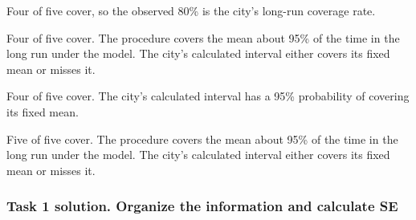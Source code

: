 
\begin{answeroptions}
    \item Four of five cover, so the observed 80\% is the city's long-run coverage rate.
    \item Four of five cover. The procedure covers the mean about 95\% of the time in the long run under the model. The city's calculated interval either covers its fixed mean or misses it.
    \item Four of five cover. The city's calculated interval has a 95\% probability of covering its fixed mean.
    \item Five of five cover. The procedure covers the mean about 95\% of the time in the long run under the model. The city's calculated interval either covers its fixed mean or misses it.
\end{answeroptions}

\clearpage
\subsubsection*{Task 1 solution. Organize the information and calculate SE}
\label{sol:c2-1-a}

